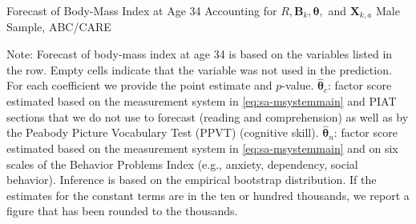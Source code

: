 \begin{table}
\begin{threeparttable}
\caption{Forecast of Body-Mass Index at Age 34 Accounting for $R, \bm{B}_k, \bm{\theta},$ and $\bm{X}_{k,a}$ Male Sample, ABC/CARE}
\label{table:end3}
\centering
\scriptsize

\begin{tablenotes}
\footnotesize
\item Note: Forecast of body-mass index at age 34 is based on the variables listed in the row. Empty cells indicate that the variable was not used in the prediction. For each coefficient we provide the point estimate and $p$-value. $\hat{\bm{\theta}}_{c}$: factor score estimated based on the measurement system in \eqref{eq:sa-msystemmain} and PIAT sections that we do not use to forecast (reading and comprehension) as well as by the Peabody Picture Vocabulary Test (PPVT) (cognitive skill). $\hat{\bm{\theta}}_{n}$: factor score estimated based on the measurement system in \eqref{eq:sa-msystemmain} and on six scales of the Behavior Problems Index (e.g., anxiety, dependency, social behavior). Inference is based on the empirical bootstrap distribution. If the estimates for the constant terms are in the ten or hundred thousands, we report a figure that has been rounded to the thousands.
\end{tablenotes}
\end{threeparttable}
\end{table}

